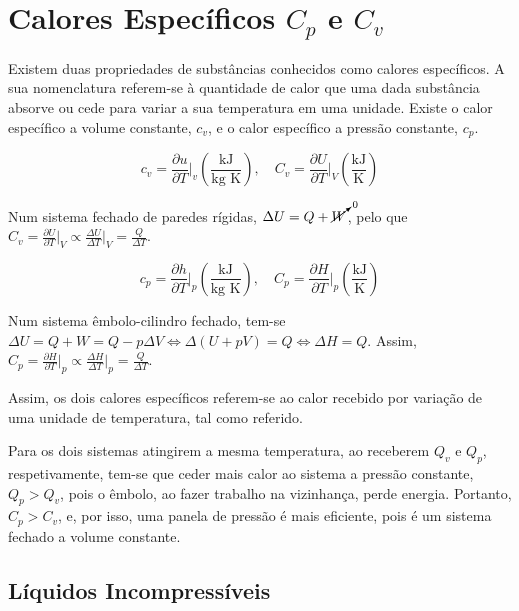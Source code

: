 \section[Calores Específicos Cp e Cv]{Calores Específicos $C_p$ e $C_v$}

Existem duas propriedades de substâncias conhecidos como calores específicos. A sua nomenclatura referem-se à quantidade de calor que uma dada substância absorve ou cede para variar a sua temperatura em uma unidade. Existe o calor específico a volume constante, $c_v$, e o calor específico a pressão constante, $c_p$.  

\begin{equation}
    c_v = \frac{\partial u}{\partial T} \bigr|_{v} \left( \frac{\text{kJ}}{\text{kg K}} \right), \quad C_v = \frac{\partial U}{\partial T} \bigr|_{V} \left( \frac{\text{kJ}}{\text{K}} \right)
\end{equation}

Num sistema fechado de paredes rígidas, $\Delta U = Q + \cancelto{0}{W}$, pelo que $C_v = \frac{\partial U}{\partial T} \bigr|_{V} \propto \frac{\Delta U}{\Delta T}\bigr|_{V} = \frac{Q}{\Delta T}$.

\begin{equation}
    c_p = \frac{\partial h}{\partial T} \bigr|_{p} \left( \frac{\text{kJ}}{\text{kg K}} \right), \quad C_p = \frac{\partial H}{\partial T} \bigr|_{p} \left( \frac{\text{kJ}}{\text{K}} \right)
\end{equation}

Num sistema êmbolo-cilindro fechado, tem-se $\Delta U = Q + W = Q - p \Delta V \Longleftrightarrow \Delta (U + pV) = Q \Longleftrightarrow \Delta H = Q$. Assim, $C_p = \frac{\partial H}{\partial T} \bigr|_{p} \propto \frac{\Delta H}{\Delta T}\bigr|_{p} = \frac{Q}{\Delta T}$.

Assim, os dois calores específicos referem-se ao calor recebido por variação de uma unidade de temperatura, tal como referido.

Para os dois sistemas atingirem a mesma temperatura, ao receberem $Q_v$ e $Q_p$, respetivamente, tem-se que ceder mais calor ao sistema a pressão constante, $Q_p > Q_v$, pois o êmbolo, ao fazer trabalho na vizinhança, perde energia. Portanto, $C_p > C_v$, e, por isso, uma panela de pressão é mais eficiente, pois é um sistema fechado a volume constante.

\subsection{Líquidos Incompressíveis}

